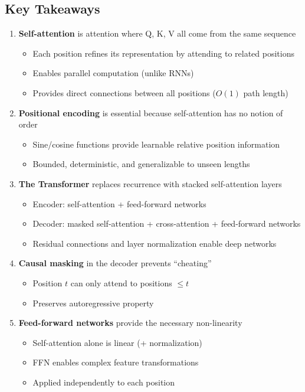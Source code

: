 \documentclass{article}
\begin{document}
\subsection{Key Takeaways}

\begin{enumerate}
\item \textbf{Self-attention} is attention where Q, K, V all come from the same sequence
\begin{itemize}
\item Each position refines its representation by attending to related positions
\item Enables parallel computation (unlike RNNs)
\item Provides direct connections between all positions ($O(1)$ path length)
\end{itemize}

\item \textbf{Positional encoding} is essential because self-attention has no notion of order
\begin{itemize}
\item Sine/cosine functions provide learnable relative position information
\item Bounded, deterministic, and generalizable to unseen lengths
\end{itemize}

\item \textbf{The Transformer} replaces recurrence with stacked self-attention layers
\begin{itemize}
\item Encoder: self-attention + feed-forward networks
\item Decoder: masked self-attention + cross-attention + feed-forward networks
\item Residual connections and layer normalization enable deep networks
\end{itemize}

\item \textbf{Causal masking} in the decoder prevents ``cheating''
\begin{itemize}
\item Position $t$ can only attend to positions $\leq t$
\item Preserves autoregressive property
\end{itemize}

\item \textbf{Feed-forward networks} provide the necessary non-linearity
\begin{itemize}
\item Self-attention alone is linear (+ normalization)
\item FFN enables complex feature transformations
\item Applied independently to each position
\end{itemize}


\end{enumerate}
\end{document}
